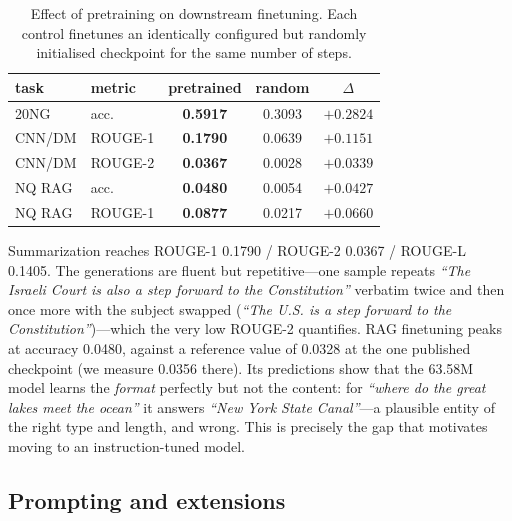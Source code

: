 \documentclass[11pt]{article}
\begin{document}
\begin{table}[t]
\centering\small
\begin{tabular}{@{}llccc@{}}
\toprule
task & metric & pretrained & random & $\Delta$ \\
\midrule
20NG    & acc.    & \textbf{0.5917} & 0.3093 & $+0.2824$ \\
CNN/DM  & ROUGE-1 & \textbf{0.1790} & 0.0639 & $+0.1151$ \\
CNN/DM  & ROUGE-2 & \textbf{0.0367} & 0.0028 & $+0.0339$ \\
NQ RAG  & acc.    & \textbf{0.0480} & 0.0054 & $+0.0427$ \\
NQ RAG  & ROUGE-1 & \textbf{0.0877} & 0.0217 & $+0.0660$ \\
\bottomrule
\end{tabular}
\caption{Effect of pretraining on downstream finetuning. Each control finetunes an
identically configured but randomly initialised checkpoint for the same number of steps.}
\label{tab:pretrainablation}
\end{table}

Summarization reaches ROUGE-1 0.1790 / ROUGE-2 0.0367 / ROUGE-L 0.1405. The generations are
fluent but repetitive---one sample repeats \emph{``The Israeli Court is also a step forward to
the Constitution''} verbatim twice and then once more with the subject swapped
(\emph{``The U.S. is a step forward to the Constitution''})---which the very low ROUGE-2
quantifies. RAG finetuning peaks
at accuracy 0.0480, against a reference value of 0.0328 at the one published checkpoint (we
measure 0.0356 there). Its predictions show that the 63.58M model learns the \emph{format}
perfectly but not the content: for \emph{``where do the great lakes meet the ocean''} it
answers \emph{``New York State Canal''}---a plausible entity of the right type and length, and
wrong. This is precisely the gap that motivates moving to an instruction-tuned model.

\subsection{Prompting and extensions}
\end{document}
